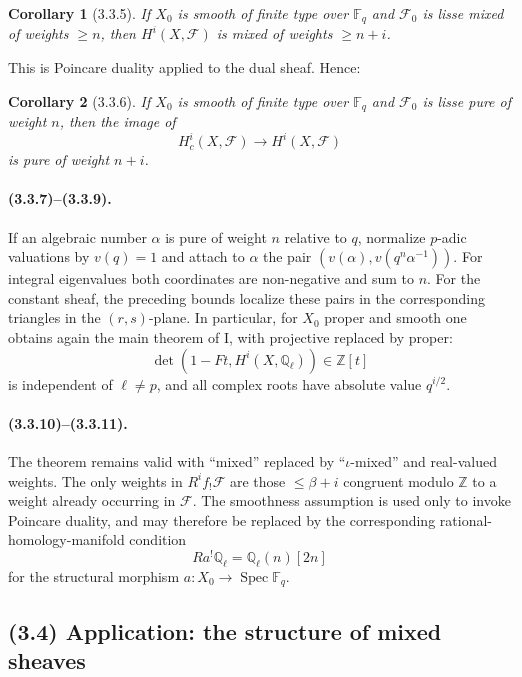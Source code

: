 \documentclass[11pt]{article}
\newtheorem{corollary}{Corollary}
\theoremstyle{remark}
\newcommand{\Ql}{\mathbb{Q}_\ell}
\newcommand{\Fq}{\mathbb{F}_q}
\newcommand{\Spec}{\operatorname{Spec}}
\begin{document}
\begin{corollary}[3.3.5]
If $X_0$ is smooth of finite type over $\Fq$ and $\mathcal F_0$ is lisse mixed of weights $\ge n$, then $H^i(X,\mathcal F)$ is mixed of weights $\ge n+i$.
\end{corollary}
This is Poincare duality applied to the dual sheaf. Hence:

\begin{corollary}[3.3.6]
If $X_0$ is smooth of finite type over $\Fq$ and $\mathcal F_0$ is lisse pure of weight $n$, then the image of
\[
H^i_c(X,\mathcal F)\longrightarrow H^i(X,\mathcal F)
\]
is pure of weight $n+i$.
\end{corollary}

\paragraph{(3.3.7)--(3.3.9).}
If an algebraic number $\alpha$ is pure of weight $n$ relative to $q$, normalize $p$-adic valuations by $v(q)=1$ and attach to $\alpha$ the pair $(v(\alpha),v(q^n\alpha^{-1}))$. For integral eigenvalues both coordinates are non-negative and sum to $n$. For the constant sheaf, the preceding bounds localize these pairs in the corresponding triangles in the $(r,s)$-plane. In particular, for $X_0$ proper and smooth one obtains again the main theorem of I, with projective replaced by proper:
\[
\det(1-Ft,H^i(X,\Ql))\in\mathbb Z[t]
\]
is independent of $\ell\ne p$, and all complex roots have absolute value $q^{i/2}$.

\paragraph{(3.3.10)--(3.3.11).}
The theorem remains valid with ``mixed'' replaced by ``$\iota$-mixed'' and real-valued weights. The only weights in $R^if_{!}\mathcal F$ are those $\le\beta+i$ congruent modulo $\mathbb Z$ to a weight already occurring in $\mathcal F$. The smoothness assumption is used only to invoke Poincare duality, and may therefore be replaced by the corresponding rational-homology-manifold condition
\[
Ra^!\Ql=\Ql(n)[2n]
\]
for the structural morphism $a:X_0\to\Spec\Fq$.

\subsection*{(3.4) Application: the structure of mixed sheaves}
\end{document}
